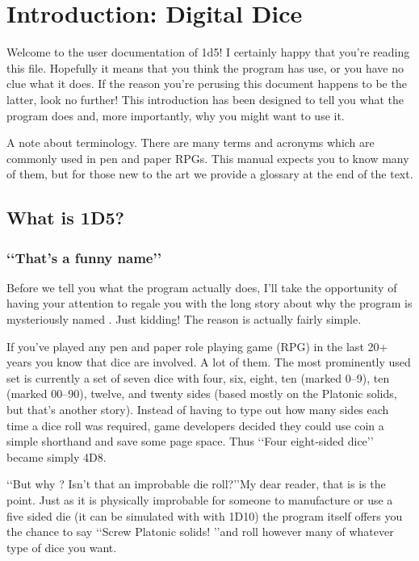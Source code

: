 \chapter{Introduction: Digital Dice}
\label{Introduction}

Welcome to the user documentation of 1d5! I certainly happy that you're reading
this file. Hopefully it means that you think the program has use, or you have
no clue what it does. If the reason you're perusing this document happens to be
the latter, look no further! This introduction has been designed to tell you
what the program does and, more importantly, why you might want to use it.

A note about terminology. There are many terms and acronyms which are commonly
used in pen and paper RPGs. This manual expects you to know many of them, but
for those new to the art we provide a glossary at the end of the text.

\section{What is 1D5?}
\label{whatisit}

\subsection*{\lq\lq That's a funny name\rq\rq }
\label{programName}
Before we tell you what the program actually does, I'll take the opportunity
of having your attention to regale you with the long story about why the
program is mysteriously named \progLogo. Just kidding! The reason
is actually fairly simple.

If you've played any pen and paper role playing game (RPG) in the last
20+ years you know that dice are involved. A lot of them. The most prominently
used set is currently a set of seven dice with four, six, eight, ten (marked
0--9), ten (marked 00--90), twelve, and twenty sides (based mostly on the
Platonic solids, but that's another story). Instead of having to type
out how many sides each time a dice roll was required,
game developers decided they could use coin a simple
shorthand and save some page space. Thus \lq\lq Four eight-sided dice\rq\rq
became simply 4D8.

\lq\lq But why \progLogo? Isn't that an improbable die roll?\rq\rq My dear
reader, that is is the point. Just as it is physically improbable for someone
to manufacture or use a five sided die (it can be simulated with with 1D10)
the program itself offers you the chance to say \lq\lq Screw Platonic solids!%
\rq\rq and roll however many of whatever type of dice you want.

